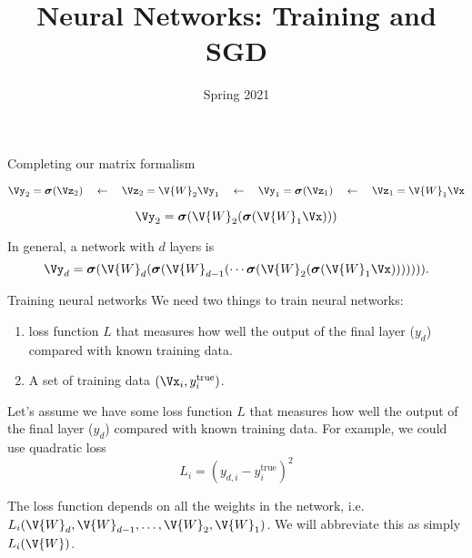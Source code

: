 \documentclass[9pt]{beamer}
\title{Neural Networks: Training and SGD}
\date{Spring 2021}
\newcommand\bsigma{\boldsymbol{\sigma}}
\newcommand\ytrue{y^\mathrm{true}}
\begin{document}
\maketitle

\begin{frame}{Completing our matrix formalism}
\begin{center}
	\small
\end{center}

\pause
\[  \Vy_2 = \bsigma(\Vz_2) \quad\leftarrow\quad
	\Vz_2 = \V{W}_2\Vy_1 \quad\leftarrow\quad
	\Vy_1 = \bsigma(\Vz_1) \quad\leftarrow\quad
	\Vz_1 = \V{W}_1\Vx	 \]

\pause
\[ \Vy_2 = \bsigma(\V{W}_2(\bsigma(\V{W}_1\Vx))) \]

\pause
\bigskip
In general, a network with $d$ layers is
\[ \Vy_d = \bsigma(\V{W}_d(\bsigma(\V{W}_{d-1}(\cdots\bsigma(\V{W}_2(\bsigma(\V{W}_1\Vx))))))). \]

\end{frame}

\begin{frame}{Training neural networks}
We need two things to train neural networks:
\begin{enumerate}
	\item  loss function $L$ that measures how well the output of the final layer ($y_d$) compared with known training data.
	\item A set of training data $(\Vx_i,\ytrue_i)$.
\end{enumerate}

\bigskip
\pause
Let's assume we have some loss function $L$ that measures how well the output of the final layer ($y_d$) compared with known training data. For example, we could use quadratic loss
\[ L_i = (y_{d,i} - \ytrue_i)^2 \]

\bigskip
\pause
The loss function depends on all the weights in the network, i.e.\ $L_i(\V{W}_d,\V{W}_{d-1},\ldots,\V{W}_2,\V{W}_1)$. We will abbreviate this as simply $L_i(\V{W})$.

\end{frame}
\end{document}
